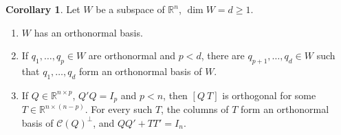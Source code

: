 \documentclass[12pt]{article}
\newcommand{\R}{\mathbb R}
\theoremstyle{definition}
\newtheorem{corollary}[theorem]{Corollary}
\begin{document}
\begin{corollary}\label{b6.15}
Let \(W\) be a subspace of \(\R^n\), \(\dim W=d\geqslant1\).
\begin{enumerate}
\item \(W\) has an orthonormal basis.
\item If \(q_1,\dots,q_p\in W\) are orthonormal and \(p<d\), there are \(q_{p+1},\dots,q_d\in W\) such that
\(q_1,\dots,q_d\) form an orthonormal basis of \(W\).
\item If \(Q\in\R^{n\times p}\), \(Q'Q=I_p\) and \(p<n\), then \([Q\ T]\) is orthogonal for some
\(T\in\R^{n\times(n-p)}\). For every such \(T\), the columns of \(T\) form an orthonormal basis of \(\mathcal C(Q)^\perp\),
and \(QQ'+TT'=I_n\).
\end{enumerate}
\end{corollary}
\end{document}
